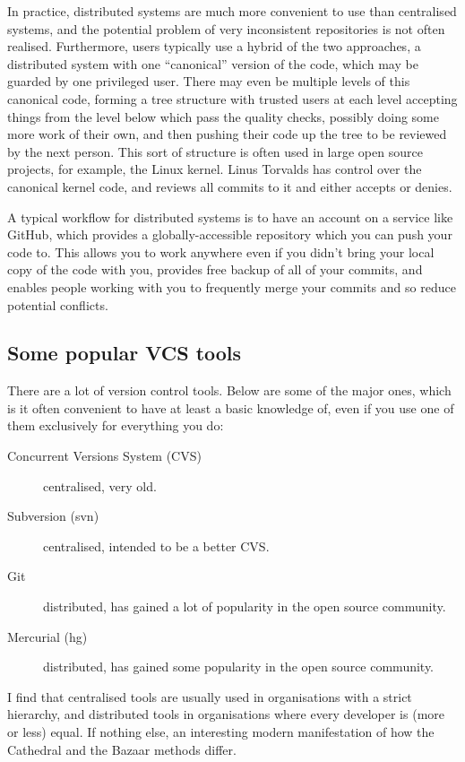 \documentclass[12pt,a4paper]{article}
\begin{document}
In practice, distributed systems are much more convenient to use than
centralised systems, and the potential problem of very inconsistent
repositories is not often realised. Furthermore, users typically use a
hybrid of the two approaches, a distributed system with one
``canonical'' version of the code, which may be guarded by one
privileged user. There may even be multiple levels of this canonical
code, forming a tree structure with trusted users at each level
accepting things from the level below which pass the quality checks,
possibly doing some more work of their own, and then pushing their
code up the tree to be reviewed by the next person. This sort of
structure is often used in large open source projects, for example,
the Linux kernel. Linus Torvalds has control over the canonical kernel
code, and reviews all commits to it and either accepts or denies.

A typical workflow for distributed systems is to have an account on a
service like GitHub, which provides a globally-accessible repository
which you can push your code to. This allows you to work anywhere even
if you didn't bring your local copy of the code with you, provides
free backup of all of your commits, and enables people working with
you to frequently merge your commits and so reduce potential
conflicts.

\subsection{Some popular VCS tools}

There are a lot of version control tools. Below are some of the major
ones, which is it often convenient to have at least a basic knowledge
of, even if you use one of them exclusively for everything you do:

\begin{description}
  \item[Concurrent Versions System (CVS)] centralised, very old.
  \item[Subversion (svn)] centralised, intended to be a better CVS.
  \item[Git] distributed, has gained a lot of popularity in the open
    source community.
  \item[Mercurial (hg)] distributed, has gained some popularity in the
    open source community.
\end{description}

I find that centralised tools are usually used in organisations with a
strict hierarchy, and distributed tools in organisations where every
developer is (more or less) equal. If nothing else, an interesting
modern manifestation of how the Cathedral and the Bazaar methods
differ.
\end{document}
